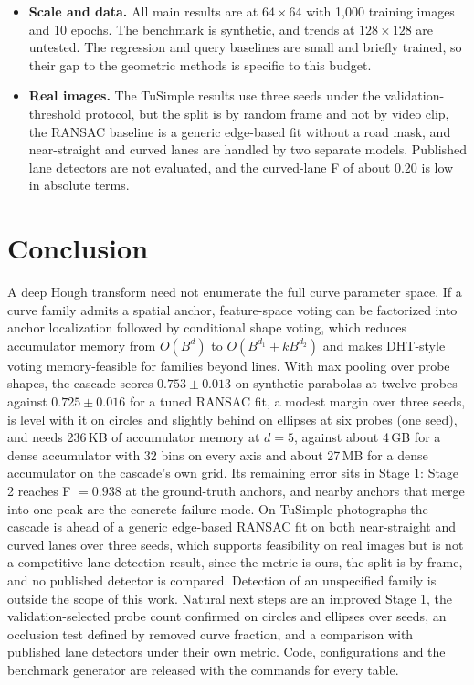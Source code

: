 \documentclass[11pt]{article}
\begin{document}
\begin{itemize}
  \item \textbf{Scale and data.} All main results are at $64\times64$ with 1{,}000 training images and 10 epochs. The benchmark is synthetic, and trends at $128\times128$ are untested. The regression and query baselines are small and briefly trained, so their gap to the geometric methods is specific to this budget.
  \item \textbf{Real images.} The TuSimple results use three seeds under the validation-threshold protocol, but the split is by random frame and not by video clip, the RANSAC baseline is a generic edge-based fit without a road mask, and near-straight and curved lanes are handled by two separate models. Published lane detectors are not evaluated, and the curved-lane F of about 0.20 is low in absolute terms.
\end{itemize}

\section{Conclusion}
A deep Hough transform need not enumerate the full curve parameter space. If a curve family admits a spatial anchor, feature-space voting can be factorized into anchor localization followed by conditional shape voting, which reduces accumulator memory from $O(B^{d})$ to $O(B^{d_1}+kB^{d_2})$ and makes DHT-style voting memory-feasible for families beyond lines. With max pooling over probe shapes, the cascade scores $0.753\pm0.013$ on synthetic parabolas at twelve probes against $0.725\pm0.016$ for a tuned RANSAC fit, a modest margin over three seeds, is level with it on circles and slightly behind on ellipses at six probes (one seed), and needs 236\,KB of accumulator memory at $d=5$, against about 4\,GB for a dense accumulator with 32 bins on every axis and about 27\,MB for a dense accumulator on the cascade's own grid. Its remaining error sits in Stage 1: Stage 2 reaches F $=0.938$ at the ground-truth anchors, and nearby anchors that merge into one peak are the concrete failure mode. On TuSimple photographs the cascade is ahead of a generic edge-based RANSAC fit on both near-straight and curved lanes over three seeds, which supports feasibility on real images but is not a competitive lane-detection result, since the metric is ours, the split is by frame, and no published detector is compared. Detection of an unspecified family is outside the scope of this work. Natural next steps are an improved Stage 1, the validation-selected probe count confirmed on circles and ellipses over seeds, an occlusion test defined by removed curve fraction, and a comparison with published lane detectors under their own metric. Code, configurations and the benchmark generator are released with the commands for every table.
\end{document}
